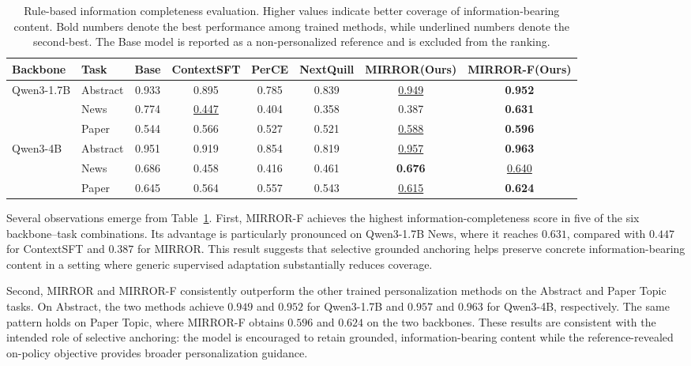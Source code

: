 \documentclass{article} %
\begin{document}
\begin{table}[t]
\centering
\small
\caption{Rule-based information completeness evaluation. Higher values
indicate better coverage of information-bearing content. Bold numbers denote
the best performance among trained methods, while underlined numbers denote
the second-best. The Base model is reported as a non-personalized reference
and is excluded from the ranking.}
\label{tab:rule_based_completeness}
\begin{tabular}{llcccccc}
\toprule
Backbone & Task
& Base
& ContextSFT
& PerCE
& NextQuill
& MIRROR(Ours)
& MIRROR-F(Ours) \\
\midrule
Qwen3-1.7B
& Abstract
& 0.933
& 0.895
& 0.785
& 0.839
& \underline{0.949}
& \textbf{0.952} \\
& News
& 0.774
& \underline{0.447}
& 0.404
& 0.358
& 0.387
& \textbf{0.631} \\
& Paper
& 0.544
& 0.566
& 0.527
& 0.521
& \underline{0.588}
& \textbf{0.596} \\
\midrule
Qwen3-4B
& Abstract
& 0.951
& 0.919
& 0.854
& 0.819
& \underline{0.957}
& \textbf{0.963} \\
& News
& 0.686
& 0.458
& 0.416
& 0.461
& \textbf{0.676}
& \underline{0.640} \\
& Paper
& 0.645
& 0.564
& 0.557
& 0.543
& \underline{0.615}
& \textbf{0.624} \\
\bottomrule
\end{tabular}
\end{table}

Several observations emerge from Table~\ref{tab:rule_based_completeness}.
First, MIRROR-F achieves the highest information-completeness score in five
of the six backbone--task combinations. Its advantage is particularly
pronounced on Qwen3-1.7B News, where it reaches $0.631$, compared with
$0.447$ for ContextSFT and $0.387$ for MIRROR. This result suggests that
selective grounded anchoring helps preserve concrete information-bearing
content in a setting where generic supervised adaptation substantially
reduces coverage.

Second, MIRROR and MIRROR-F consistently outperform the other trained
personalization methods on the Abstract and Paper Topic tasks. On Abstract,
the two methods achieve $0.949$ and $0.952$ for Qwen3-1.7B and $0.957$ and
$0.963$ for Qwen3-4B, respectively. The same pattern holds on Paper Topic,
where MIRROR-F obtains $0.596$ and $0.624$ on the two backbones. These results
are consistent with the intended role of selective anchoring: the model is
encouraged to retain grounded, information-bearing content while the
reference-revealed on-policy objective provides broader personalization
guidance.
\end{document}
